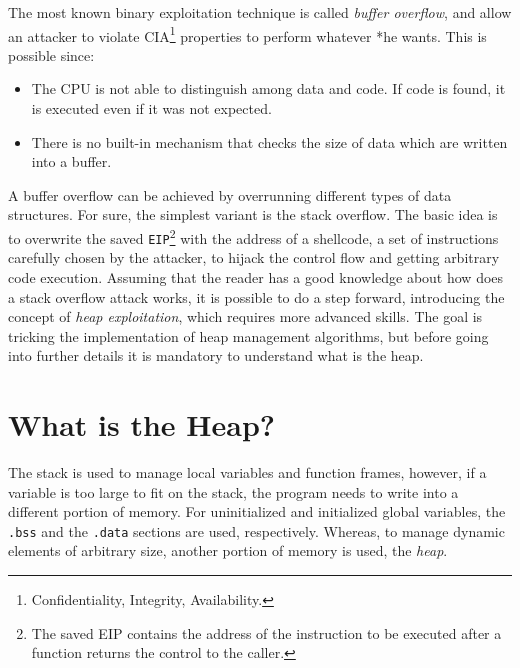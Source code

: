 \documentclass{article}
\numberwithin{equation}{subsection}
\begin{document}
The most known binary exploitation technique is called \emph{buffer overflow}, and allow an attacker to violate CIA\footnote{Confidentiality, Integrity, Availability.} properties to perform whatever *he wants. This is possible since:
\begin{itemize}
    \item The CPU is not able to distinguish among data and code. If code is found, it is executed even if it was not expected.
    \item There is no built-in mechanism that checks the size of data which are written into a buffer.
\end{itemize}
A buffer overflow can be achieved by overrunning different types of data structures. For sure, the simplest variant is the stack overflow. The basic idea is to overwrite the saved \texttt{EIP}\footnote{The saved EIP contains the address of the instruction to be executed after a function returns the control to the caller.} with the address of a shellcode, a set of instructions carefully chosen by the attacker, to hijack the control flow and getting arbitrary code execution. Assuming that the reader has a good knowledge about how does a stack overflow attack works, it is possible to do a step forward, introducing the concept of \emph{heap exploitation}, which requires more advanced skills. The goal is tricking the implementation of heap management algorithms, but before going into further details it is mandatory to understand what is the heap.

\section{What is the Heap?}
The stack is used to manage local variables and function frames, however, if a variable is too large to fit on the stack, the program needs to write into a different portion of memory. For uninitialized and initialized global variables, the \texttt{.bss} and the \texttt{.data} sections are used, respectively. Whereas, to manage dynamic elements of arbitrary size, another portion of memory is used, the \emph{heap}. 
\end{document}
